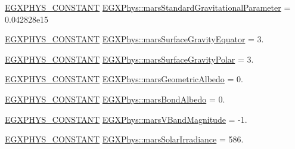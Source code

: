 \begin{DoxyCompactItemize}
\item 
\mbox{\hyperlink{group___e_g_x_phys-_constants-_macros_ga76980d288494ce1714c9ac68a95ba702}{E\+G\+X\+P\+H\+Y\+S\+\_\+\+C\+O\+N\+S\+T\+A\+NT}} \mbox{\hyperlink{group___e_g_x_phys-_constants-_astrophysics-_solar_system-_mars-_bulk_gaed58caacb1033aed7f065712d3740b80}{E\+G\+X\+Phys\+::mars\+Standard\+Gravitational\+Parameter}} = 0.\+042828e15
\item 
\mbox{\hyperlink{group___e_g_x_phys-_constants-_macros_ga76980d288494ce1714c9ac68a95ba702}{E\+G\+X\+P\+H\+Y\+S\+\_\+\+C\+O\+N\+S\+T\+A\+NT}} \mbox{\hyperlink{group___e_g_x_phys-_constants-_astrophysics-_solar_system-_mars-_bulk_gab539556e60edb738ad95331ce681eb23}{E\+G\+X\+Phys\+::mars\+Surface\+Gravity\+Equator}} = 3.
\item 
\mbox{\hyperlink{group___e_g_x_phys-_constants-_macros_ga76980d288494ce1714c9ac68a95ba702}{E\+G\+X\+P\+H\+Y\+S\+\_\+\+C\+O\+N\+S\+T\+A\+NT}} \mbox{\hyperlink{group___e_g_x_phys-_constants-_astrophysics-_solar_system-_mars-_bulk_ga36597d59fa02325d03d8703d402cbb1f}{E\+G\+X\+Phys\+::mars\+Surface\+Gravity\+Polar}} = 3.
\item 
\mbox{\hyperlink{group___e_g_x_phys-_constants-_macros_ga76980d288494ce1714c9ac68a95ba702}{E\+G\+X\+P\+H\+Y\+S\+\_\+\+C\+O\+N\+S\+T\+A\+NT}} \mbox{\hyperlink{group___e_g_x_phys-_constants-_astrophysics-_solar_system-_mars-_bulk_gaf8793cdbb717f966e968edc2d443bdee}{E\+G\+X\+Phys\+::mars\+Geometric\+Albedo}} = 0.
\item 
\mbox{\hyperlink{group___e_g_x_phys-_constants-_macros_ga76980d288494ce1714c9ac68a95ba702}{E\+G\+X\+P\+H\+Y\+S\+\_\+\+C\+O\+N\+S\+T\+A\+NT}} \mbox{\hyperlink{group___e_g_x_phys-_constants-_astrophysics-_solar_system-_mars-_bulk_ga9e8ddb7e6501c2426bc750822807259c}{E\+G\+X\+Phys\+::mars\+Bond\+Albedo}} = 0.
\item 
\mbox{\hyperlink{group___e_g_x_phys-_constants-_macros_ga76980d288494ce1714c9ac68a95ba702}{E\+G\+X\+P\+H\+Y\+S\+\_\+\+C\+O\+N\+S\+T\+A\+NT}} \mbox{\hyperlink{group___e_g_x_phys-_constants-_astrophysics-_solar_system-_mars-_bulk_ga42329bb55497fce9d36f086206e21b10}{E\+G\+X\+Phys\+::mars\+V\+Band\+Magnitude}} = -\/1.
\item 
\mbox{\hyperlink{group___e_g_x_phys-_constants-_macros_ga76980d288494ce1714c9ac68a95ba702}{E\+G\+X\+P\+H\+Y\+S\+\_\+\+C\+O\+N\+S\+T\+A\+NT}} \mbox{\hyperlink{group___e_g_x_phys-_constants-_astrophysics-_solar_system-_mars-_bulk_gaf4647940197398f1f5b28c24efbbd50e}{E\+G\+X\+Phys\+::mars\+Solar\+Irradiance}} = 586.
\item 

\end{DoxyCompactItemize}
